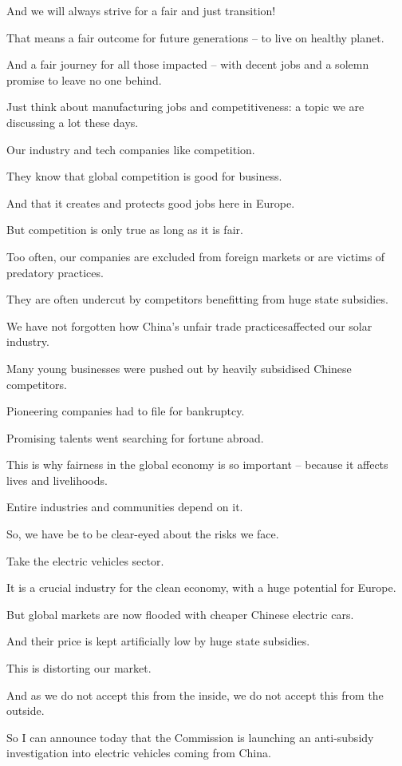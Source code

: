 \documentclass[a4paper,11pt]{article}
\begin{document}
And we will always strive for a fair and just transition!

That means a fair outcome for future generations – to live on healthy planet.

And a fair journey for all those impacted – with decent jobs and a solemn promise to leave no one behind.

Just think about manufacturing jobs and competitiveness: a topic we are discussing a lot these days.

Our industry and tech companies like competition.

They know that global competition is good for business.

And that it creates and protects good jobs here in Europe.

But competition is only true as long as it is fair.

Too often, our companies are excluded from foreign markets or are victims of predatory practices.

They are often undercut by competitors benefitting from huge state subsidies.

We have not forgotten how China's unfair trade practicesaffected our solar industry.

Many young businesses were pushed out by heavily subsidised Chinese competitors.

Pioneering companies had to file for bankruptcy.

Promising talents went searching for fortune abroad.

This is why fairness in the global economy is so important – because it affects lives and livelihoods.

Entire industries and communities depend on it.

So, we have be to be clear-eyed about the risks we face.

Take the electric vehicles sector. 

It is a crucial industry for the clean economy, with a huge potential for Europe.

But global markets are now flooded with cheaper Chinese electric cars.

And their price is kept artificially low by huge state subsidies.

This is distorting our market.

And as we do not accept this from the inside, we do not accept this from the outside.

So I can announce today that the Commission is launching an anti-subsidy investigation into electric vehicles coming from China. 
\end{document}
